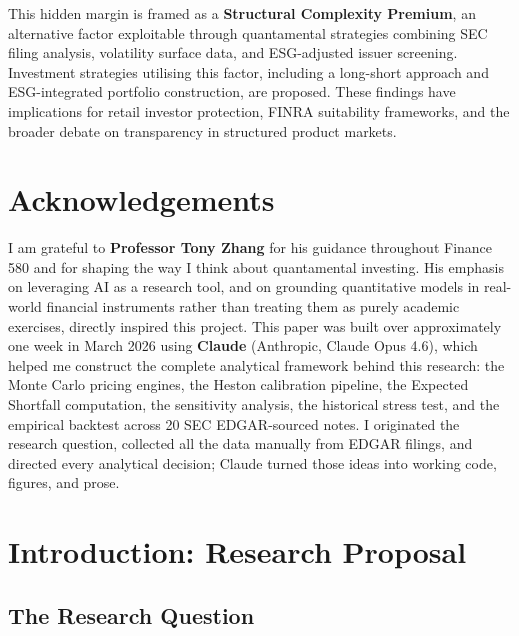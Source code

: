 \documentclass[12pt,a4paper]{article}
\begin{document}
This hidden margin is framed as a \textbf{Structural Complexity Premium}, an alternative factor exploitable through quantamental strategies combining SEC filing analysis, volatility surface data, and ESG-adjusted issuer screening. Investment strategies utilising this factor, including a long-short approach and ESG-integrated portfolio construction, are proposed. These findings have implications for retail investor protection, FINRA suitability frameworks, and the broader debate on transparency in structured product markets.

\newpage
\section*{Acknowledgements}

I am grateful to \textbf{Professor Tony Zhang} for his guidance throughout Finance 580 and for shaping the way I think about quantamental investing. His emphasis on leveraging AI as a research tool, and on grounding quantitative models in real-world financial instruments rather than treating them as purely academic exercises, directly inspired this project. This paper was built over approximately one week in March 2026 using \textbf{Claude} (Anthropic, Claude Opus 4.6), which helped me construct the complete analytical framework behind this research: the Monte Carlo pricing engines, the Heston calibration pipeline, the Expected Shortfall computation, the sensitivity analysis, the historical stress test, and the empirical backtest across 20 SEC EDGAR-sourced notes. I originated the research question, collected all the data manually from EDGAR filings, and directed every analytical decision; Claude turned those ideas into working code, figures, and prose.

\newpage
\tableofcontents

\newpage
\section{Introduction: Research Proposal}
\label{sec:intro}

\subsection{The Research Question}
\end{document}
